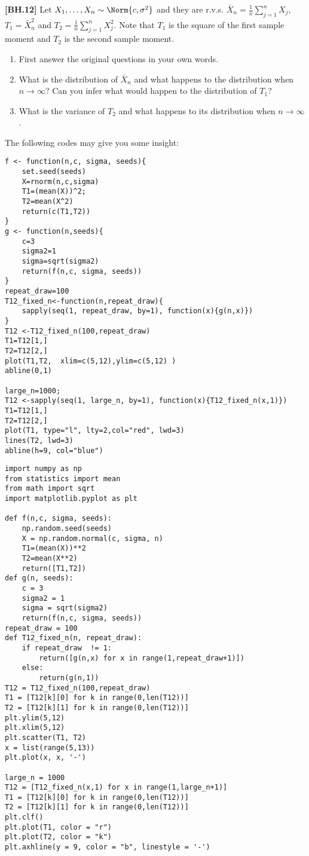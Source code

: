 \begin{exercise}
	\textbf{[BH.12]} Let $X_1, \ldots, X_n \sim \Norm{c, \sigma^2}$ and they are \iid r.v.s. $\bar{X}_n = \frac{1}{n} \sum_{j = 1}^n X_j$, $T_1 = \bar{X}_n^2$ and $T_2 = \frac{1}{n} \sum_{j = 1}^n X_j^2$. Note that $T_1$ is the square of the first sample moment and $T_2$ is the second sample moment.
	\begin{enumerate}
\item First answer the original questions in your own words.
\item What is the distribution of $\bar{X}_n$ and what happens to the distribution when $n\rightarrow \infty$? Can you infer what would happen to the distribution of $T_1$?
\item What is the variance of $T_2$ and what happens to its distribution when  $n\rightarrow \infty$.
	\end{enumerate}
	The following codes may give you some insight:
	\begin{verbatim}
f <- function(n,c, sigma, seeds){
	set.seed(seeds)
	X=rnorm(n,c,sigma)
	T1=(mean(X))^2;
	T2=mean(X^2)
	return(c(T1,T2))
} 
g <- function(n,seeds){
	c=3
	sigma2=1
	sigma=sqrt(sigma2)
	return(f(n,c, sigma, seeds))
}
repeat_draw=100
T12_fixed_n<-function(n,repeat_draw){
	sapply(seq(1, repeat_draw, by=1), function(x){g(n,x)})
}
T12 <-T12_fixed_n(100,repeat_draw)
T1=T12[1,] 
T2=T12[2,]
plot(T1,T2,  xlim=c(5,12),ylim=c(5,12) )
abline(0,1)

large_n=1000;
T12 <-sapply(seq(1, large_n, by=1), function(x){T12_fixed_n(x,1)})
T1=T12[1,] 
T2=T12[2,]
plot(T1, type="l", lty=2,col="red", lwd=3)
lines(T2, lwd=3)
abline(h=9, col="blue")
	\end{verbatim}
\begin{verbatim}
import numpy as np
from statistics import mean
from math import sqrt
import matplotlib.pyplot as plt

def f(n,c, sigma, seeds):
    np.random.seed(seeds)
    X = np.random.normal(c, sigma, n)
    T1=(mean(X))**2
    T2=mean(X**2)
    return([T1,T2])
def g(n, seeds):
    c = 3
    sigma2 = 1
    sigma = sqrt(sigma2)
    return(f(n,c, sigma, seeds))
repeat_draw = 100
def T12_fixed_n(n, repeat_draw):
    if repeat_draw  != 1:
        return([g(n,x) for x in range(1,repeat_draw+1)])
    else:
        return(g(n,1))
T12 = T12_fixed_n(100,repeat_draw)
T1 = [T12[k][0] for k in range(0,len(T12))]
T2 = [T12[k][1] for k in range(0,len(T12))]
plt.ylim(5,12)
plt.xlim(5,12)
plt.scatter(T1, T2)
x = list(range(5,13))
plt.plot(x, x, '-')

large_n = 1000
T12 = [T12_fixed_n(x,1) for x in range(1,large_n+1)]
T1 = [T12[k][0] for k in range(0,len(T12))]
T2 = [T12[k][1] for k in range(0,len(T12))]
plt.clf()
plt.plot(T1, color = "r")
plt.plot(T2, color = "k")
plt.axhline(y = 9, color = "b", linestyle = '-')
		\end{verbatim}
	
\end{exercise} 